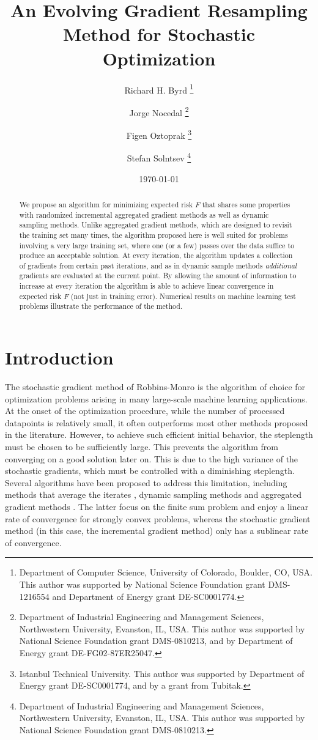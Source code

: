 \documentclass[11pt]{article}
\title{An Evolving Gradient Resampling Method for Stochastic Optimization}
\author{Richard H. Byrd 
\thanks{Department of Computer Science, University of Colorado, Boulder, CO, USA. This author was supported by National Science Foundation grant DMS-1216554 and Department of Energy grant DE-SC0001774.} 
\and Jorge Nocedal 
\thanks{Department of Industrial Engineering and Management Sciences, Northwestern University, Evanston, IL, USA. This author was supported by National Science Foundation grant DMS-0810213, and by Department of Energy grant DE-FG02-87ER25047.} 
\and Figen Oztoprak 
\thanks{Istanbul Technical University. This author was supported by Department of Energy grant DE-SC0001774, and by a grant from Tubitak.} 
\and Stefan Solntsev \thanks{Department of Industrial Engineering and Management Sciences, Northwestern University, Evanston, IL, USA. This author was supported by National Science Foundation grant DMS-0810213.} 
}
\date{\today}
\begin{document}
\maketitle 
\begin{abstract}
We propose an algorithm for minimizing expected risk $F$ that shares some properties with randomized  incremental aggregated gradient methods as well as  dynamic sampling methods. Unlike aggregated gradient methods, which are designed to revisit the training set many times, the algorithm proposed here is well suited for problems involving a very large training set,  where one (or a few) passes over the data suffice to produce an acceptable solution.  At every iteration, the algorithm updates  a collection of gradients  from certain past iterations, and as in dynamic sample methods \emph{additional} gradients are evaluated at the current point. By allowing the amount of information to increase at every iteration the algorithm is able to achieve  linear convergence in expected risk $F$ (not just in training error). Numerical results on machine learning test problems illustrate the performance of the method. 
\end{abstract}
 
%

\section{Introduction}

The stochastic gradient method of Robbins-Monro \cite{RobMon51} is the algorithm of choice for optimization problems arising in many large-scale machine learning applications.  At the onset of the optimization procedure, while the number of processed datapoints is relatively small, it often outperforms most other methods proposed in the literature. However, to achieve such efficient initial behavior, the steplength must be chosen to be sufficiently large. This prevents the algorithm from converging on a good solution later on. This is due to the high variance of the stochastic gradients, which must be controlled with a diminishing steplength. Several algorithms have been proposed to address this limitation, including methods that average the iterates \cite{PolJud92,ruppert1988efficient, Nesterov:09}, dynamic sampling methods \cite{dss,FS2011,2014pasglyetal} and aggregated gradient methods  \cite{roux2012stochastic,johnson2013accelerating,shalev2013stochastic,mairal2015incremental,defazio2014finito,frostig2014competing,NIPS2014_5258}.
The latter focus on the finite sum problem and enjoy a linear rate of convergence for strongly convex problems, whereas the stochastic gradient method (in this case, the incremental gradient method) only has a sublinear rate of convergence. 
\end{document}
